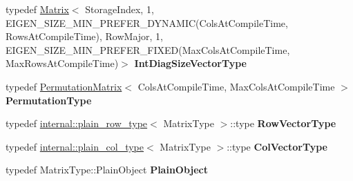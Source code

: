 \begin{DoxyCompactItemize}
\item 
\mbox{\label{class_eigen_1_1_full_piv_householder_q_r_a79d964192e828e7cc2910f219df4b2dc}} 
typedef \mbox{\hyperlink{class_eigen_1_1_matrix}{Matrix}}$<$ Storage\+Index, 1, E\+I\+G\+E\+N\+\_\+\+S\+I\+Z\+E\+\_\+\+M\+I\+N\+\_\+\+P\+R\+E\+F\+E\+R\+\_\+\+D\+Y\+N\+A\+M\+IC(Cols\+At\+Compile\+Time, Rows\+At\+Compile\+Time), Row\+Major, 1, E\+I\+G\+E\+N\+\_\+\+S\+I\+Z\+E\+\_\+\+M\+I\+N\+\_\+\+P\+R\+E\+F\+E\+R\+\_\+\+F\+I\+X\+ED(Max\+Cols\+At\+Compile\+Time, Max\+Rows\+At\+Compile\+Time)$>$ {\bfseries Int\+Diag\+Size\+Vector\+Type}
\item 
\mbox{\label{class_eigen_1_1_full_piv_householder_q_r_a29ba3c0d3d7ceb8558c6cba4b5afba89}} 
typedef \mbox{\hyperlink{class_eigen_1_1_permutation_matrix}{Permutation\+Matrix}}$<$ Cols\+At\+Compile\+Time, Max\+Cols\+At\+Compile\+Time $>$ {\bfseries Permutation\+Type}
\item 
\mbox{\label{class_eigen_1_1_full_piv_householder_q_r_a2c68675b694ac5feefbe78c6913eaa13}} 
typedef \mbox{\hyperlink{struct_eigen_1_1internal_1_1plain__row__type}{internal\+::plain\+\_\+row\+\_\+type}}$<$ Matrix\+Type $>$\+::type {\bfseries Row\+Vector\+Type}
\item 
\mbox{\label{class_eigen_1_1_full_piv_householder_q_r_a5abef403dc2f41f954dff3a52f597da4}} 
typedef \mbox{\hyperlink{struct_eigen_1_1internal_1_1plain__col__type}{internal\+::plain\+\_\+col\+\_\+type}}$<$ Matrix\+Type $>$\+::type {\bfseries Col\+Vector\+Type}
\item 
\mbox{\label{class_eigen_1_1_full_piv_householder_q_r_ac665e21d7152407fe05cd60371e5ef17}} 
typedef Matrix\+Type\+::\+Plain\+Object {\bfseries Plain\+Object}
\end{DoxyCompactItemize}
